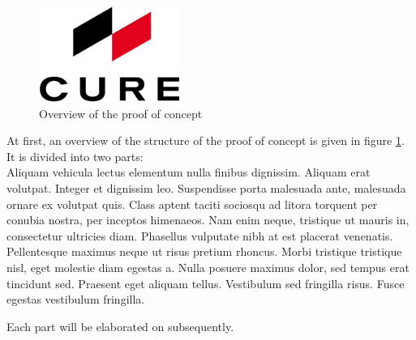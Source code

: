 \begin{figure}
    \centering
    \includegraphics[width=.6\textwidth]{images/essential/firmenlogo.png}
    \vspace{12pt}
    \caption{Overview of the proof of concept}
    \label{fig:overview}
\end{figure}
At first, an overview of the structure of the proof of concept is given in figure \ref{fig:overview}.
It is divided into two parts: \cite{Barg.2018} \\
Aliquam vehicula lectus elementum nulla finibus dignissim. Aliquam erat volutpat. Integer et dignissim leo. Suspendisse porta malesuada ante, malesuada ornare ex volutpat quis. Class aptent taciti sociosqu ad litora torquent per conubia nostra, per inceptos himenaeos. Nam enim neque, tristique ut mauris in, consectetur ultricies diam. Phasellus vulputate nibh at est placerat venenatis. Pellentesque maximus neque ut risus pretium rhoncus. Morbi tristique tristique nisl, eget molestie diam egestas a. Nulla posuere maximus dolor, sed tempus erat tincidunt sed. Praesent eget aliquam tellus. Vestibulum sed fringilla risus. Fusce egestas vestibulum fringilla.
    
Each part will be elaborated on subsequently.